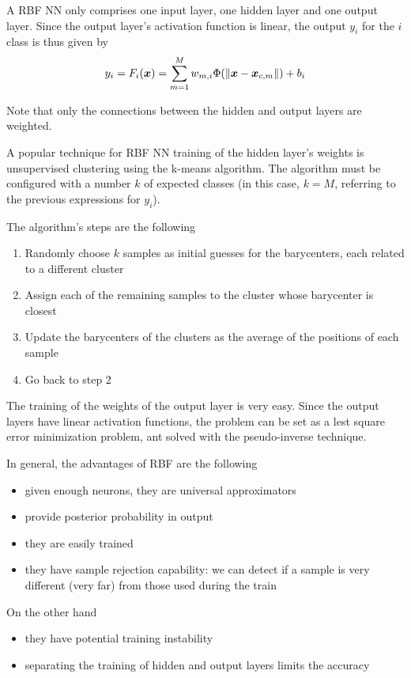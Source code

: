 \documentclass[oneside,onecolumn]{report}
\begin{document}
A RBF NN only comprises one input layer, one hidden layer and one output layer.
Since the output layer's activation function is linear, the output $y_i$ for the $i$ class is thus given by
$$ y_i = F_i(\bm x) = \sum_{m = 1}^M w_{m, i} \Phi(\norm{\bm x - \bm x_{c,m}}) + b_i $$

Note that only the connections between the hidden and output layers are weighted.

A popular technique for RBF NN training of the hidden layer's weights is unsupervised clustering using the k-means algorithm.
The algorithm must be configured with a number $k$ of expected classes (in this case, $k = M$, referring to the previous expressions for $y_i$).

The algorithm's steps are the following
\begin{enumerate}
    \item Randomly choose $k$ samples as initial guesses for the barycenters, each related to a different cluster
    \item Assign each of the remaining samples to the cluster whose barycenter is closest
    \item Update the barycenters of the clusters as the average of the positions of each sample
    \item Go back to step 2
\end{enumerate}

The training of the weights of the output layer is very easy.
Since the output layers have linear activation functions, the problem can be set as a lest square error minimization problem, ant solved with the pseudo-inverse technique.

In general, the advantages of RBF are the following
\begin{itemize}
    \item given enough neurons, they are universal approximators
    \item provide posterior probability in output
    \item they are easily trained
    \item they have sample rejection capability: we can detect if a sample is very different (very far) from those used during the train
\end{itemize}

On the other hand
\begin{itemize}
    \item they have potential training instability
    \item separating the training of hidden and output layers limits the accuracy
\end{itemize}
\end{document}
